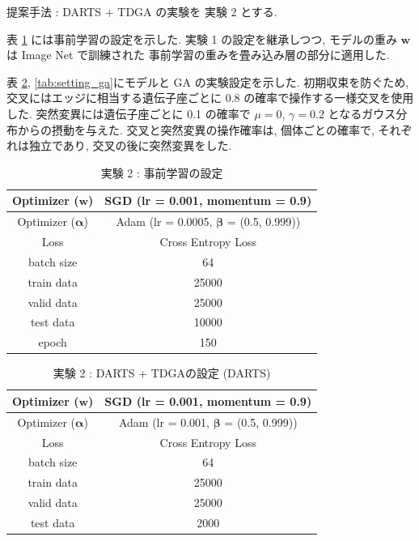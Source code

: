 提案手法 : DARTS + TDGA の実験を 実験 2 とする.

表 \ref{tab:setting_pretrain} には事前学習の設定を示した.
実験 1 の設定を継承しつつ,
モデルの重み $\bm{w}$ は Image Net\cite{deng2009imagenet} で訓練された
事前学習の重みを畳み込み層の部分に適用した.

表 \ref{tab:setting_darts}, \ref{tab:setting_ga}にモデルと GA の実験設定を示した.
初期収束を防ぐため, 交叉にはエッジに相当する遺伝子座ごとに 0.8 の確率で操作する一様交叉を使用した.
突然変異には遺伝子座ごとに 0.1 の確率で $\mu=0$, $\gamma=0.2$ となるガウス分布からの摂動を与えた.
交叉と突然変異の操作確率は, 個体ごとの確率で, それぞれは独立であり, 交叉の後に突然変異をした.


\begin{table}[tb]
  \begin{center}
    \caption{実験 2 : 事前学習の設定}
  	\vspace{3mm}
    \begin{tabular}{|c|c|} \hline
      Optimizer ($\bm{w}$) & SGD (lr = 0.001, momentum = 0.9) \\ \hline
      Optimizer ($\bm{\alpha}$) & Adam (lr = 0.0005, $\bm{\beta}$ = (0.5, 0.999)) \\ \hline
      Loss & Cross Entropy Loss \\ \hline
      batch size & 64 \\ \hline
      train data & 25000\\ \hline
      valid data & 25000\\ \hline
      test data &  10000\\ \hline
      epoch & 150\\ \hline
    \end{tabular}
    \label{tab:setting_pretrain}
  \end{center}
\end{table}

\begin{table}[t]
  \begin{center}
    \caption{実験 2 : DARTS + TDGAの設定 (DARTS)}
  	\vspace{3mm}
    \begin{tabular}{|c|c|} \hline
      Optimizer ($\bm{w}$) & SGD (lr = 0.001, momentum = 0.9) \\ \hline
      Optimizer ($\bm{\alpha}$) & Adam (lr = 0.001, $\bm{\beta}$ = (0.5, 0.999)) \\ \hline
      Loss & Cross Entropy Loss \\ \hline
      batch size & 64 \\ \hline
      train data & 25000\\ \hline
      valid data & 25000\\ \hline
      test data &  2000\\ \hline
    \end{tabular}
    \label{tab:setting_darts}
  \end{center}
\end{table}

